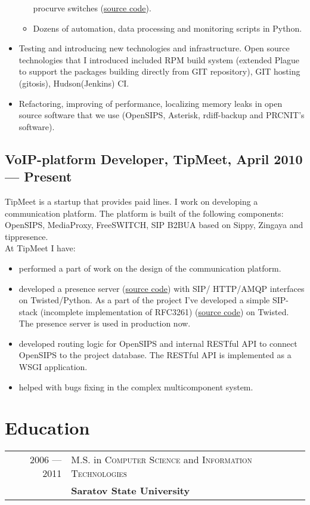 \documentclass[a4paper,10pt]{article}
\begin{document}
\begin{itemize}
\begin{itemize}
procurve switches (\href{http://git.sgu.ru/?p=aaa\_hp.git;a=summary}{source
code}).
 \item Dozens of automation, data processing and monitoring scripts in Python.
 \end{itemize}
\item Testing and introducing new technologies and infrastructure. Open source
technologies that I introduced included RPM build system (extended Plague to
support the packages building directly from GIT repository), GIT hosting
(gitosis), Hudson(Jenkins) CI.
\item Refactoring, improving of performance, localizing memory leaks in open
source software that we use (OpenSIPS, Asterisk, rdiff-backup and PRCNIT's
software).
\end{itemize}

\subsection{VoIP-platform Developer, TipMeet, April 2010 --- Present}
TipMeet is a startup that provides paid lines. I work on developing
a communication platform. The platform is built of the following components:
OpenSIPS, MediaProxy, FreeSWITCH, SIP B2BUA based on Sippy, Zingaya and
tippresence.\\
At TipMeet I have:
\begin{itemize}
\item performed a part of work on the design of the communication platform.
\item developed a presence server
(\href{http://github.com/tipmeet/tippresence}{source code}) with SIP\slash
HTTP\slash AMQP interfaces on Twisted\slash Python. As a part of the project
I've developed a simple SIP-stack (incomplete implementation of RFC3261)
(\href{http://github.com/tipmeet/tipsip}{source code}) on
Twisted. The presence server is used in production now.
\item developed routing logic for OpenSIPS and internal RESTful API
to connect OpenSIPS to the project database. The RESTful API is implemented as
a WSGI application.
\item helped with bugs fixing in the complex multicomponent system.
\end{itemize}


\section{Education}
\begin{tabular}{rl}
2006 --- 2011& M.S. in \textsc{Computer Science} and \textsc{Information
Technologies} \\& \textbf{Saratov State University}
\end{tabular}
\end{document}
